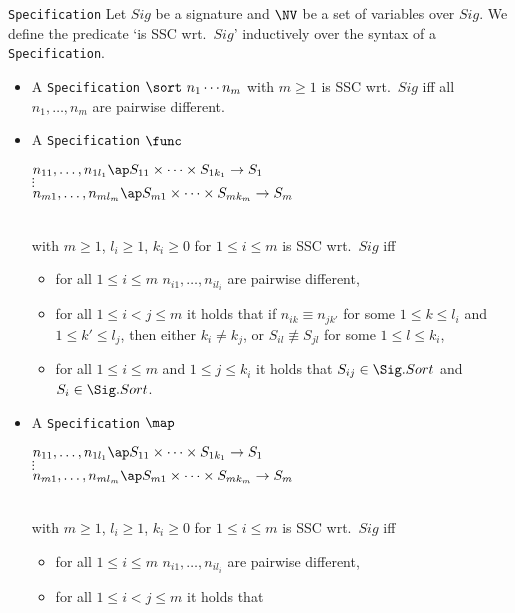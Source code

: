 \documentclass[twoside,fleqn,a4paper,dvips]{article}
\begin{document}
\begin{Dn-arg}{{\tt Specification}}
Let $Sig$ be a signature and $\NV$ be a set of variables over $Sig$. We
define the predicate `is SSC wrt.\ $Sig$'
inductively over the syntax of a {\tt Specification}.
\begin{itemize}
\item
A {\tt Specification}
$\sort~n_1\cdots n_m$ with $m\geq 1$
is SSC wrt.\ $Sig$ iff all $n_1,\ldots,n_m$ are pairwise
different.
\item
A {\tt Specification}
$\func$
\begin{minipage}[t]{7cm}
$n_{11},\ldots,n_{1l_1}\ap S_{11}\times \cdots\times S_{1k_1}\rightarrow
S_1$\\
$\vdots$\\
$n_{m1},\ldots,n_{ml_m}\ap S_{m1}\times \cdots\times S_{mk_m}\rightarrow
S_m$\vspace{2ex}
\end{minipage}\\
with $m\geq 1$, $l_i\geq 1$, $k_i\geq 0$ for $1\leq i\leq m$
is SSC wrt.\ $Sig$ iff 
\begin{itemize}
\item
for all $1\leq i\leq m$  $n_{i1},\ldots,n_{il_i}$ are
pairwise different,
\item
for all $1\leq i<j\leq m$ it holds that
if $n_{ik}\equiv n_{jk'}$ for some $1\leq k\leq l_i$ and $1\leq
k'\leq l_j$, then either $k_i\neq k_j$, or $S_{il}\not\equiv
S_{jl}$ for some $1\leq l\leq k_i$,
\item
for all $1\leq i\leq m$ and $1\leq j\leq k_i$ it holds that
$S_{ij}\in \Sig.Sort$ and $S_i\in \Sig.Sort$.
\end{itemize}
\item
A {\tt Specification}
$\map$
\begin{minipage}[t]{7cm}
$n_{11},\ldots,n_{1l_1}\ap S_{11}\times \cdots\times S_{1k_1}\rightarrow
S_1$\\
$\vdots$\\
$n_{m1},\ldots,n_{ml_m}\ap S_{m1}\times \cdots\times S_{mk_m}\rightarrow
S_m$\vspace{2ex}
\end{minipage}\\
with $m\geq 1$, $l_i\geq 1$, $k_i\geq 0$ for $1\leq i\leq m$
is SSC wrt.\ $Sig$ iff 
\begin{itemize}
\item
for all $1\leq i\leq m$  $n_{i1},\ldots,n_{il_i}$ are
pairwise different,
\item
for all $1\leq i<j\leq m$ it holds that

\end{itemize}
\end{itemize}
\end{Dn-arg}
\end{document}
